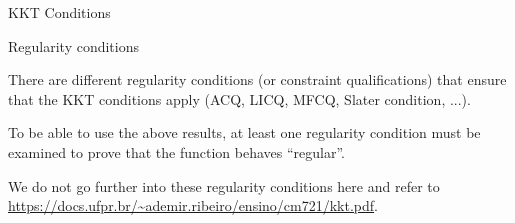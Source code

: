 \documentclass[11pt,compress,t,notes=noshow, xcolor=table]{beamer}
\begin{document}
\begin{vbframe}{KKT Conditions}
\end{vbframe}

\begin{vbframe}{Regularity conditions}

There are different regularity conditions (or constraint qualifications) that ensure that the KKT conditions apply (ACQ, LICQ, MFCQ, Slater condition, ...).

\lz

To be able to use the above results, at least one regularity condition must be examined to prove that the function behaves \enquote{regular}.

\lz

We do not go further into these regularity conditions here and refer to \url{https://docs.ufpr.br/~ademir.ribeiro/ensino/cm721/kkt.pdf}.

\end{vbframe}
\end{document}
